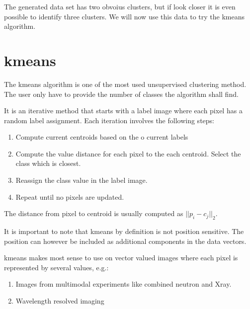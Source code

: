 \documentclass[letterpaper,10pt,english]{sphinxmanual}
\begin{document}
\noindent{}

The generated data set has two obvoius clusters, but if look closer it is even possible to identify three clusters. We will now use this data to try the k\sphinxhyphen{}means algorithm.


\section{k\sphinxhyphen{}means}
\label{\detokenize{ML4NeutronImageSegmentation:k-means}}
The k\sphinxhyphen{}means algorithm is one of the most used unsupervised clustering method. The user only have to provide the number of classes the algorithm shall find.

It is an iterative method that starts with a label image where each pixel has a random label assignment. Each iteration involves the following steps:
\begin{enumerate}
%
\item {} 
Compute current centroids based on the o current labels

\item {} 
Compute the value distance for each pixel to the each centroid. Select the class which is closest.

\item {} 
Reassign the class value in the label image.

\item {} 
Repeat until no pixels are updated.

\end{enumerate}

The distance from pixel  to centroid  is usually computed as \(||p_i - c_j||_2\).

It is important to note that k\sphinxhyphen{}means by definition is not position sensitive. The position can however be included as additional components in the data vectors.

k\sphinxhyphen{}means makes most sense to use on vector valued images where each pixel is represented by several values, e.g.:
\begin{enumerate}
%
\item {} 
Images from multimodal experiments like combined neutron and X\sphinxhyphen{}ray.

\item {} 
Wavelength resolved imaging

\end{enumerate}
\end{document}
